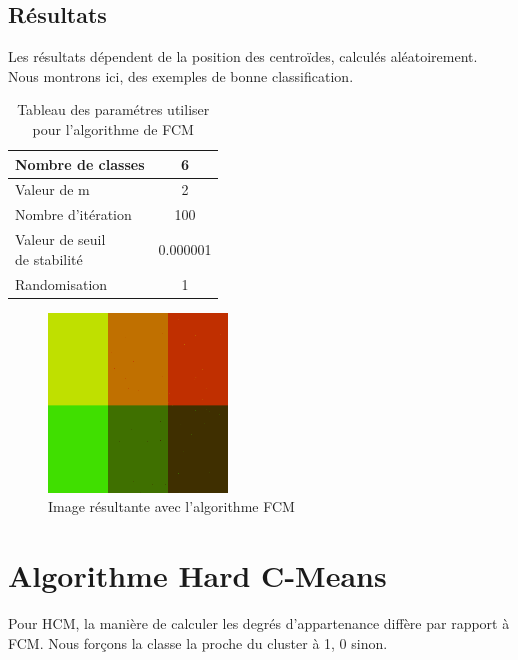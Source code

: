 \documentclass[a4paper,11pt]{article}
\begin{document}
\subsection{Résultats}

Les résultats dépendent de la position des centroïdes, calculés 
aléatoirement. 
Nous montrons ici, des exemples de bonne classification.

\begin{table}[H]
  \begin{center}
    \begin{tabular}{|l|c|}
      \hline
      Nombre de classes & 6 \\
      \hline
      Valeur de m & 2 \\
      \hline
      Nombre d'itération & 100 \\
      \hline
      \shortstack{ Valeur de seuil \\ de stabilité } & 0.000001 \\
      \hline
      Randomisation & 1 \\
      \hline
    \end{tabular}
    \caption{Tableau des paramétres utiliser pour l'algorithme de FCM}
  \end{center}
\end{table}


\begin{figure}[H]
  \begin{center} 
    \includegraphics[width=180px]{../img/segFCM.png}
    \caption{Image résultante avec l'algorithme FCM}
  \end{center}
\end{figure}

\section{Algorithme Hard C-Means}

Pour HCM, la manière de calculer les degrés d'appartenance diffère 
par rapport à FCM. Nous forçons la classe la proche du cluster à 1, 0 
sinon.
\end{document}
